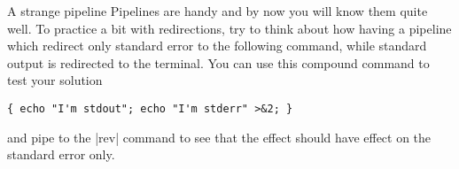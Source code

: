 
\begin{exercise}[Technical]{A strange pipeline}
    Pipelines are handy and by now you will know them quite well.
    To practice a bit with redirections, try to think about how having a pipeline which redirect only standard error to the following command, while standard output is redirected to the terminal.
    You can use this compound command to test your solution
    \begin{lstlisting}[style=MyBash]
        { echo "I'm stdout"; echo "I'm stderr" >&2; }
    \end{lstlisting}
    and pipe to the \bash|rev| command to see that the effect should have effect on the standard error only.
\end{exercise}

